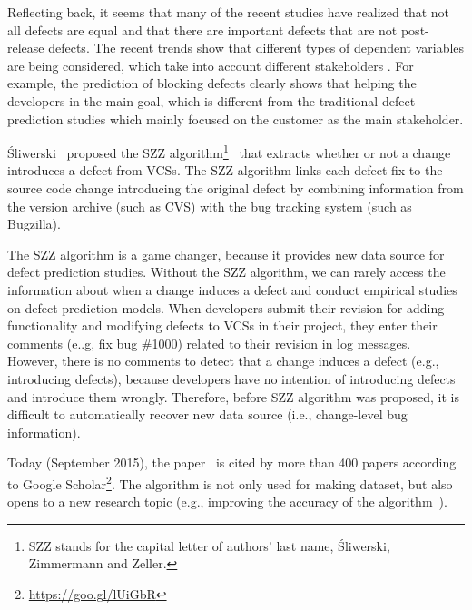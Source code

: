 Reflecting back, it seems that many of the recent studies have realized that not all defects are equal and that there are important defects that are not post-release defects. The recent trends show that different types of dependent variables are being considered, which take into account different stakeholders . For example, the prediction of blocking defects clearly shows that helping the developers in the main goal, which is different from the traditional defect prediction studies which mainly focused on the customer as the main stakeholder. 


\begin{oframed}
\vspace{-0.2cm}
\'{S}liwerski \ea ~proposed the SZZ algorithm\footnote{SZZ stands for the capital letter of authors' last name, \'{S}liwerski, Zimmermann and Zeller.}~\cite{sliwerski2005} that extracts whether or not a change introduces a defect from VCSs. The SZZ algorithm links each defect fix to the source code change introducing the original defect by combining information from the version archive (such as CVS) with the bug tracking system (such as Bugzilla).

The SZZ algorithm is a game changer, because it provides new data source for defect prediction studies. Without the SZZ algorithm, we can rarely access the information about when a change induces a defect and conduct empirical studies on defect prediction models.
When developers submit their revision for adding functionality and modifying defects to VCSs in their project, they enter their comments (e..g, fix bug \#1000) related to their revision in log messages.
However, there is no comments to detect that a change induces a defect (e.g., introducing defects), because developers 
have no intention of introducing defects and introduce them wrongly.
Therefore, before SZZ algorithm was proposed, it is difficult to automatically recover new data source (i.e., change-level bug information). 

Today (September 2015), the paper~\cite{sliwerski2005} is cited by more than 400 papers according to Google Scholar\footnote{\url{https://goo.gl/lUiGbR}}. The algorithm is not only used for making dataset, but also opens to a new research topic (e.g., improving the accuracy of the algorithm~\cite{Kim2006ASE}).
\end{oframed}

